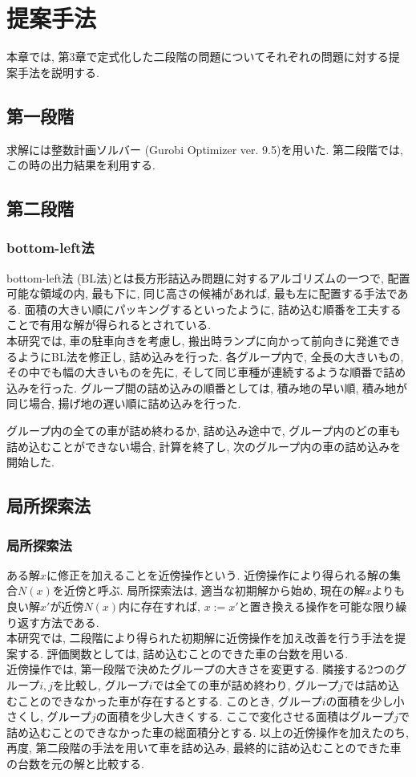 \chapter{提案手法}\label{method}
本章では, 第3章で定式化した二段階の問題についてそれぞれの問題に対する提案手法を説明する. 

\section{第一段階}
求解には整数計画ソルバー (Gurobi Optimizer ver. 9.5)を用いた. 
第二段階では, この時の出力結果を利用する.  

\section{第二段階}
\subsection*{bottom-left法}
bottom-left法 (BL法)とは長方形詰込み問題に対するアルゴリズムの一つで, 配置可能な領域の内, 最も下に, 同じ高さの候補があれば, 最も左に配置する手法である\cite{nfp2}. 
面積の大きい順にパッキングするといったように, 詰め込む順番を工夫することで有用な解が得られるとされている. \\


本研究では, 車の駐車向きを考慮し, 搬出時ランプに向かって前向きに発進できるようにBL法を修正し, 詰め込みを行った. 
各グループ内で, 全長の大きいもの, その中でも幅の大きいものを先に, そして同じ車種が連続するような順番で詰め込みを行った. 
グループ間の詰め込みの順番としては, 積み地の早い順, 積み地が同じ場合, 揚げ地の遅い順に詰め込みを行った. 

グループ内の全ての車が詰め終わるか, 詰め込み途中で, グループ内のどの車も詰め込むことができない場合, 計算を終了し, 次のグループ内の車の詰め込みを開始した. 

\section{局所探索法}
\subsection*{局所探索法}
ある解$x$に修正を加えることを近傍操作という\cite{local-search}. 
近傍操作により得られる解の集合$N(x)$を近傍と呼ぶ. 
局所探索法は, 適当な初期解から始め, 現在の解$x$よりも良い解$x'$が近傍$N(x)$内に存在すれば, $x:=x'$と置き換える操作を可能な限り繰り返す方法である. \\

本研究では, 二段階により得られた初期解に近傍操作を加え改善を行う手法を提案する. 
評価関数としては, 詰め込むことのできた車の台数を用いる. \\
近傍操作では, 第一段階で決めたグループの大きさを変更する. 
隣接する2つのグループ$i,j$を比較し, グループ$i$では全ての車が詰め終わり, グループ$j$では詰め込むことのできなかった車が存在するとする. 
このとき, グループ$i$の面積を少し小さくし, グループ$j$の面積を少し大きくする. 
ここで変化させる面積はグループ$j$で詰め込むことのできなかった車の総面積分とする. 
以上の近傍操作を加えたのち, 再度, 第二段階の手法を用いて車を詰め込み, 最終的に詰め込むことのできた車の台数を元の解と比較する. 

